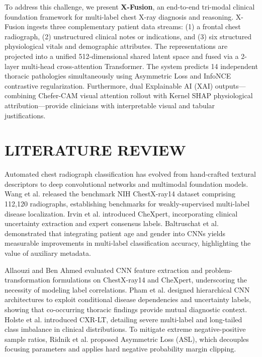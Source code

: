 \documentclass[conference]{IEEEtran}
\begin{document}
To address this challenge, we present \textbf{X-Fusion}, an end-to-end tri-modal clinical foundation framework for multi-label chest X-ray diagnosis and reasoning. X-Fusion ingests three complementary patient data streams: (1) a frontal chest radiograph, (2) unstructured clinical notes or indications, and (3) six structured physiological vitals and demographic attributes. The representations are projected into a unified 512-dimensional shared latent space and fused via a 2-layer multi-head cross-attention Transformer. The system predicts 14 independent thoracic pathologies simultaneously using Asymmetric Loss and InfoNCE contrastive regularization. Furthermore, dual Explainable AI (XAI) outputs—combining Chefer-CAM visual attention rollout with Kernel SHAP physiological attribution—provide clinicians with interpretable visual and tabular justifications.

\section{LITERATURE REVIEW}
Automated chest radiograph classification has evolved from hand-crafted textural descriptors to deep convolutional networks and multimodal foundation models. Wang et al. \cite{wang2017chestxray8} released the benchmark NIH ChestX-ray14 dataset comprising 112,120 radiographs, establishing benchmarks for weakly-supervised multi-label disease localization. Irvin et al. \cite{irvin2019chexpert} introduced CheXpert, incorporating clinical uncertainty extraction and expert consensus labels. Baltruschat et al. \cite{baltruschat2019comparison} demonstrated that integrating patient age and gender into CNNs yields measurable improvements in multi-label classification accuracy, highlighting the value of auxiliary metadata.

Allaouzi and Ben Ahmed \cite{allaouzi2019multilabel} evaluated CNN feature extraction and problem-transformation formulations on ChestX-ray14 and CheXpert, underscoring the necessity of modeling label correlations. Pham et al. \cite{pham2021interpreting} designed hierarchical CNN architectures to exploit conditional disease dependencies and uncertainty labels, showing that co-occurring thoracic findings provide mutual diagnostic context. Holste et al. \cite{holste2024cxrlt} introduced CXR-LT, detailing severe multi-label and long-tailed class imbalance in clinical distributions. To mitigate extreme negative-positive sample ratios, Ridnik et al. \cite{ridnik2021asymmetric} proposed Asymmetric Loss (ASL), which decouples focusing parameters and applies hard negative probability margin clipping.
\end{document}
